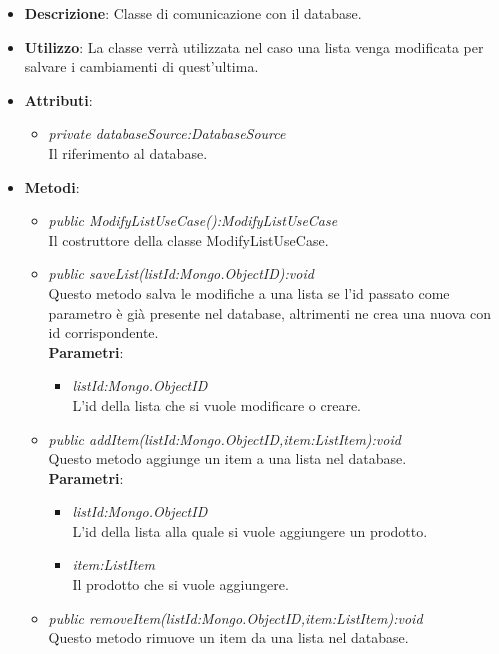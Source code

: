\begin{itemize}
\item \textbf{Descrizione}: Classe di comunicazione con il database.
\item \textbf{Utilizzo}: La classe verrà utilizzata nel caso una lista venga modificata per salvare i cambiamenti di quest'ultima.
\item \textbf{Attributi}: 
	\begin{itemize}
	\item \textit{private databaseSource:DatabaseSource}\\
	Il riferimento al database.
	\end{itemize}
\item \textbf{Metodi}:
	\begin{itemize}
	\item \textit{public ModifyListUseCase():ModifyListUseCase}\\
	Il costruttore della classe ModifyListUseCase.
	\item \textit{public saveList(listId:Mongo.ObjectID):void}\\
	Questo metodo salva le modifiche a una lista se l'id passato come parametro è già presente nel database, altrimenti ne crea una nuova con id corrispondente.
				\\ \textbf{Parametri}: \begin{itemize}
			\item \textit{listId:Mongo.ObjectID}\\
			L'id della lista che si vuole modificare o creare.
					\end{itemize} 
	\item \textit{public addItem(listId:Mongo.ObjectID,item:ListItem):void}\\
	Questo metodo aggiunge un item a una lista nel database.
				\\ \textbf{Parametri}: \begin{itemize}
			\item \textit{listId:Mongo.ObjectID}\\
			L'id della lista alla quale si vuole aggiungere un prodotto.
			\item \textit{item:ListItem}\\
			Il prodotto che si vuole aggiungere.
					\end{itemize}
	\item \textit{public removeItem(listId:Mongo.ObjectID,item:ListItem):void}\\
	Questo metodo rimuove un item da una lista nel database.

\end{itemize}
\end{itemize}
